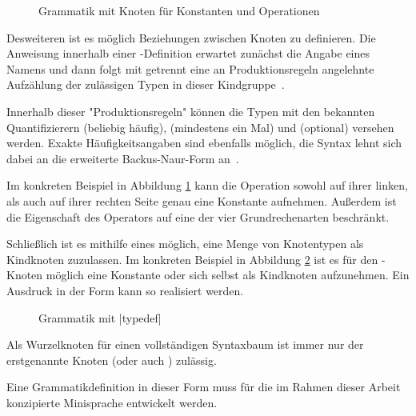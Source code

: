 \begin{figure}[h]
  
  \caption{Grammatik mit Knoten für Konstanten und Operationen}
  \label{fig:basics:grammars:2}
\end{figure}

Desweiteren ist es möglich Beziehungen zwischen Knoten zu definieren. Die Anweisung  innerhalb einer -Definition erwartet zunächst die Angabe eines Namens und dann folgt mit \inlinec{::=} getrennt eine an Produktionsregeln angelehnte Aufzählung der zulässigen Typen in dieser Kindgruppe~\cite[6]{riemer2018}.

Innerhalb dieser "Produktionsregeln" können die Typen mit den bekannten Quantifizierern \inlinec{*} (beliebig häufig), \inlinec{+} (mindestens ein Mal) und  (optional) versehen werden. Exakte Häufigkeitsangaben sind ebenfalls möglich, die Syntax lehnt sich dabei an die erweiterte Backus-Naur-Form an~\cite[6]{riemer2018}.

Im konkreten Beispiel in Abbildung \ref{fig:basics:grammars:2} kann die Operation  sowohl auf ihrer linken, als auch auf ihrer rechten Seite genau eine Konstante aufnehmen. Außerdem ist die Eigenschaft des Operators auf eine der vier Grundrechenarten beschränkt.

Schließlich ist es mithilfe eines  möglich, eine Menge von Knotentypen als Kindknoten zuzulassen. Im konkreten Beispiel in Abbildung \ref{fig:basics:grammars:3} ist es für den -Knoten möglich eine Konstante oder sich selbst als Kindknoten aufzunehmen. Ein Ausdruck in der Form  kann so realisiert werden.

\begin{figure}[h]
  
  \caption{Grammatik mit \inlinec|typedef|}
  \label{fig:basics:grammars:3}
\end{figure}

Als Wurzelknoten für einen vollständigen Syntaxbaum ist immer nur der erstgenannte Knoten (oder auch ) zulässig.

Eine Grammatikdefinition in dieser Form muss für die im Rahmen dieser Arbeit konzipierte Minisprache entwickelt werden.
